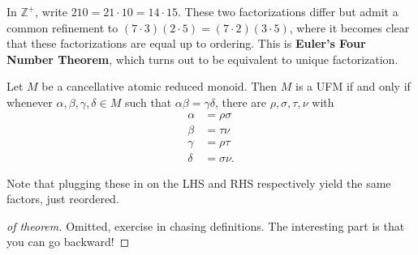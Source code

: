 \begin{example}

In \({\mathbb{Z}}^+\), write \(210 = 21\cdot 10 = 14 \cdot 15\). These
two factorizations differ but admit a common refinement to
\((7\cdot 3)(2\cdot 5) = (7\cdot 2)(3\cdot 5)\), where it becomes clear
that these factorizations are equal up to ordering. This is
\textbf{Euler's Four Number Theorem}, which turns out to be equivalent
to unique factorization.

\end{example}

\begin{theorem}

Let \(M\) be a cancellative atomic reduced monoid. Then \(M\) is a UFM
if and only if whenever \(\alpha, \beta, \gamma, \delta \in M\) such
that \(\alpha \beta = \gamma \delta\), there are
\(\rho, \sigma, \tau, \nu\) with
\begin{align*}
\alpha &= \rho \sigma \\
\beta &= \tau \nu \\
\gamma &= \rho \tau \\
\delta &= \sigma \nu
.\end{align*}

Note that plugging these in on the LHS and RHS respectively yield the
same factors, just reordered.

\end{theorem}

\begin{proof}[of theorem]

Omitted, exercise in chasing definitions. The interesting part is that
you can go backward!

\end{proof}

